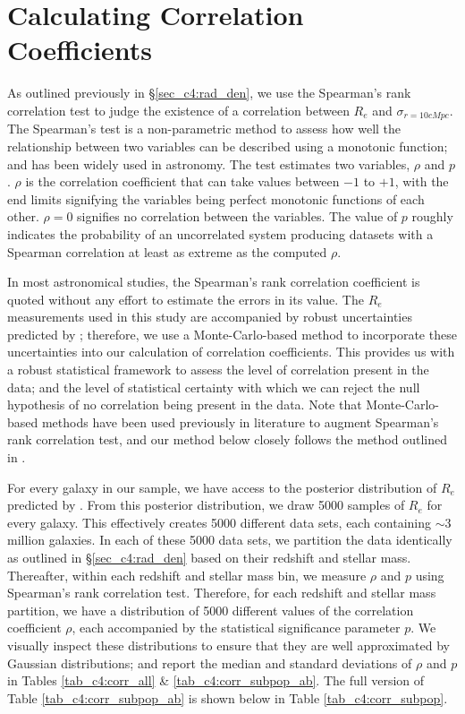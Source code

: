 \section{Calculating Correlation Coefficients \label{sec_c4:ap:corr_coeff}}

As outlined previously in \S \ref{sec_c4:rad_den}, we use the Spearman's rank correlation test \citep{spearman_original} to judge the existence of a correlation between $R_e$ and $\sigma_{r=10cMpc}$. The Spearman's test is a non-parametric method to assess how well the relationship between two variables can be described using a monotonic function; and has been widely used in astronomy. The test estimates two variables, $\rho$ and $p$. $\rho$ is the correlation coefficient that can take values between $-1$ to $+1$, with the end limits signifying the variables being perfect monotonic functions of each other. $\rho=0$ signifies no correlation between the variables. The value of $p$ roughly indicates the probability of an uncorrelated system producing datasets with a Spearman correlation at least as extreme as the computed $\rho$.

In most astronomical studies, the Spearman's rank correlation coefficient is quoted without any effort to estimate the errors in its value. The $R_e$ measurements used in this study are accompanied by robust uncertainties predicted by \gampen{}; therefore, we use a Monte-Carlo-based method to incorporate these uncertainties into our calculation of correlation coefficients. This provides us with a robust statistical framework to assess the level of correlation present in the data; and the level of statistical certainty with which we can reject the null hypothesis of no correlation being present in the data. Note that Monte-Carlo-based methods have been used previously in literature to augment Spearman's rank correlation test, and our method below closely follows the method outlined in \citet{curran_14}.

For every galaxy in our sample, we have access to the posterior distribution of $R_e$ predicted by \gampen{}. From this posterior distribution, we draw 5000 samples of $R_e$ for every galaxy. This effectively creates 5000 different data sets, each containing $\sim3$ million galaxies. In each of these 5000 data sets, we partition the data identically as outlined in \S \ref{sec_c4:rad_den} based on their redshift and stellar mass. Thereafter, within each redshift and stellar mass bin, we measure $\rho$ and $p$ using Spearman's rank correlation test. Therefore, for each redshift and stellar mass partition, we have a distribution of 5000 different values of the correlation coefficient $\rho$, each accompanied by the statistical significance parameter $p$. We visually inspect these distributions to ensure that they are well approximated by Gaussian distributions; and report the median and standard deviations of $\rho$ and $p$ in Tables \ref{tab_c4:corr_all} \& \ref{tab_c4:corr_subpop_ab}. The full version of Table \ref{tab_c4:corr_subpop_ab} is shown below in Table \ref{tab_c4:corr_subpop}. 



